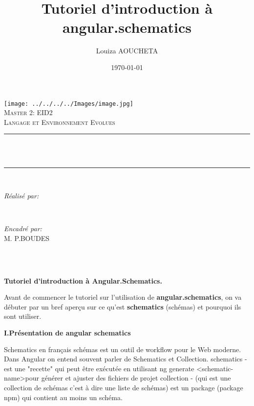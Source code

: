 \documentclass[12pt,french]{article}
\title{Tutoriel d'introduction à angular.schematics}
\author{Louiza AOUCHETA}
\date{\today}
\makeatletter
\let\thetitle\@title
\let\theauthor\@author
\let\thedate\@date
\makeatother
\begin{document}

\begin{titlepage}
\centering 
\texttt{[image: ../../../../Images/image.jpg]} \\
    \vspace*{0.5 cm}
    \textsc{\LARGE Master 2: EID2}\\[2.0 cm]	
	\textsc{\large Langage et Environnement Evolues}\\[0.5 cm]				%
	\rule{\linewidth}{0.2 mm} \\[0.4 cm]
	{ \huge \bfseries \thetitle}\\
	\rule{\linewidth}{0.2 mm} \\[1.5 cm]
	
	\begin{minipage}{0.4\textwidth}
		\begin{flushleft} \large
			\emph{Réalisé par:}\\
			\theauthor
			\end{flushleft}
			\end{minipage}~
			\begin{minipage}{0.4\textwidth}
			\begin{flushright} \large
			\emph{Encadré par:} \\
			M. P.BOUDES									%
		\end{flushright}
	\end{minipage}\\[2 cm]
	
	{\large \thedate}\\[2 cm]
 
	\vfill
	
\end{titlepage}

		\qquad\qquad\qquad\large{\textbf{Tutoriel d’introduction à Angular.Schematics.}}\newline
	
	Avant de commencer le tutoriel sur l'utilisation de \textbf{angular.schematics}, on va débuter par un bref aperçu sur ce qu'est \textbf{schematics} (schémas) et pourquoi ils sont utiliser.\newline
	
	\textbf{I.Présentation de angular schematics}\newline
	
	Schematics en français schémas est un outil de workflow pour le Web moderne.\newline
	Dans Angular on entend souvent parler de Schematics et Collection.\smallbreak
	schematics - est une "recette" qui peut être exécutée en utilisant ng generate <schematic-name>pour générer et ajuster des fichiers de projet\smallbreak
	collection - (qui est une collection de schémas c'est à dire une liste de schémas) est un package (package npm) qui contient au moins un schéma.\newline
	
\end{document}
